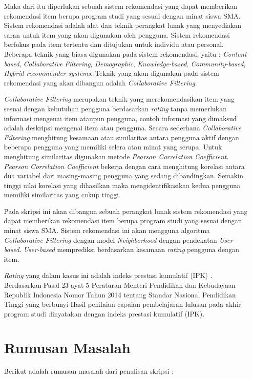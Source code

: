 Maka dari itu diperlukan sebuah sistem rekomendasi yang dapat memberikan rekomendasi item berupa program studi yang sesuai dengan minat siswa SMA. Sistem rekomendasi adalah alat dan teknik perangkat lunak yang menyediakan saran untuk item yang akan digunakan oleh pengguna. Sistem rekomendasi berfokus pada item tertentu dan ditujukan untuk individu atau personal. Beberapa teknik yang biasa digunakan pada sistem rekomendasi, yaitu : \textit{Content-based}, \textit{Collaborative Filtering}, \textit{Demographic}, \textit{Knowledge-based}, \textit{Community-based}, \textit{Hybrid recommender systems}. Teknik yang akan digunakan pada sistem rekomendasi yang akan dibangun adalah \textit{Collaborative Filtering}.

\textit{Collaborative Filtering} merupakan teknik yang merekomendasikan item yang sesuai dengan kebutuhan pengguna berdasarkan \textit{rating} tanpa memerlukan informasi mengenai item ataupun pengguna, contoh informasi yang dimaksud adalah deskripsi mengenai item atau pengguna. Secara sederhana \textit{Collaborative Filtering} menghitung kesamaan atau similaritas antara pengguna aktif dengan beberapa pengguna yang memiliki selera atau minat yang serupa. Untuk menghitung similaritas digunakan metode \textit{Pearson Correlation Coefficient}. \textit{Pearson Correlation Coefficient} bekerja dengan cara menghitung korelasi antara dua variabel dari masing-masing pengguna yang sedang dibandingkan. Semakin tinggi nilai korelasi yang dihasilkan maka mengidentifikasikan kedua pengguna memiliki similaritas yang cukup tinggi. 
 
Pada skripsi ini akan dibangun sebuah perangkat lunak sistem rekomendasi yang dapat memberikan rekomendasi item berupa program studi yang sesuai dengan minat siswa SMA. Sistem rekomendasi ini akan mengguna algoritma \textit{Collaborative Filtering} dengan model \textit{Neighborhood} dengan pendekatan \textit{User-based}. \textit{User-based} memprediksi berdasarkan kesamaan \textit{rating} pengguna dengan item. 

\textit{Rating} yang dalam kasus ini adalah indeks prestasi kumulatif (IPK) . Berdasarkan Pasal 23 ayat 5 Peraturan Menteri Pendidikan dan Kebudayaan Republik Indonesia Nomor Tahun 2014 tentang Standar Nasional Pendidikan Tinggi yang berbunyi Hasil penilaian capaian pembelajaran lulusan pada akhir program studi dinyatakan dengan indeks prestasi kumulatif (IPK).

\section{Rumusan Masalah}
\label{sec:rumusan masalah}
Berikut adalah rumusan masalah dari penulisan skripsi : 

